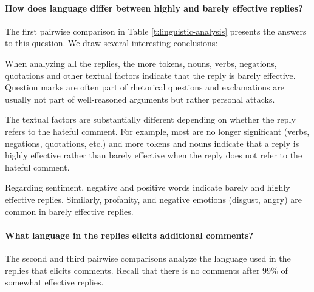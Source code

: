 \documentclass[11pt]{article}
\begin{document}


\paragraph{How does language differ between highly and barely effective replies?}
The first pairwise comparison in Table \ref{t:linguistic-analysis} presents the answers to this question.
We draw several interesting conclusions:
\begin{compactitem}
	\item When analyzing all the replies, the more tokens, nouns, verbs, negations, quotations and other textual factors indicate that the reply is barely effective.
	Question marks are often part of rhetorical questions and exclamations are usually not part of well-reasoned arguments but rather personal attacks.
	\item The textual factors are substantially different depending on whether the reply refers to the hateful comment.
	For example, most are no longer significant (verbs, negations, quotations, etc.) and more tokens and nouns indicate that a reply is highly effective rather than barely effective when the reply does not refer to the hateful comment.
	\item Regarding sentiment, negative and positive words indicate barely and highly effective replies.
	Similarly, profanity, and negative emotions (disgust, angry) are common in barely effective replies.
\end{compactitem}


\paragraph{What language in the replies elicits additional comments?}
The second and third pairwise comparisons analyze the language used in the replies
that elicits comments.
Recall that there is no comments after 99\% of somewhat effective replies.
\end{document}
